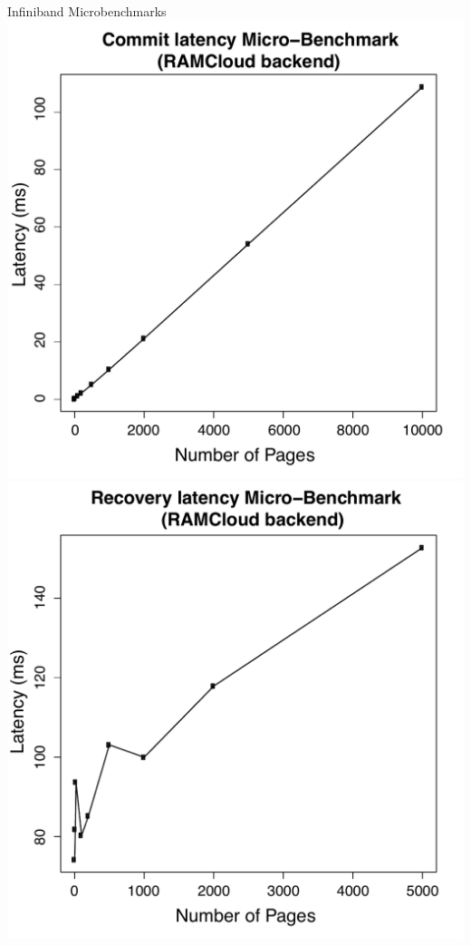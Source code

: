 \documentclass{beamer}
\begin{document}
\begin{frame}{Infiniband Microbenchmarks}
    \centering
    \includegraphics[scale=0.25]{commit_time_rc_latencies.pdf}
    \includegraphics[scale=0.25]{recovery_time_rc_latencies.pdf}
\end{frame}
\end{document}
